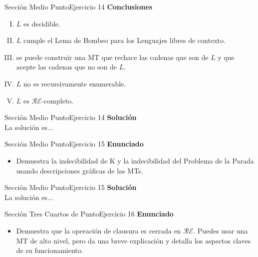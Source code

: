\documentclass[10pt, envcountsect, presentation, aspectratio=169]{beamer}
\newcommand{\lr}{\ensuremath{\mathcal {RE}}}
\begin{document}

\begin{frame}{Sección Medio Punto}{Ejercicio 14}
    \textbf{Conclusiones}
    \begin{enumerate}[I.]
        \item $L$ es  decidible.
        \item $L$ cumple el Lema de Bombeo para los Lenguajes  libres de contexto.
        \item se puede construir una MT que rechace las cadenas que son de $L$ y que acepte las cadenas que no son de $L$.
        \item $L$ no es recursivamente enumerable.
        \item $L$ es \lr-completo. 
    \end{enumerate}
\end{frame}


\begin{frame}{Sección Medio Punto}{Ejercicio 14}
    \textbf{Solución}\\
    La solución es...
\end{frame}


\begin{frame}{Sección Medio Punto}{Ejercicio 15}
    \textbf{Enunciado}
    \begin{itemize}
        \item Demuestra la indecibilidad de K y la indecibilidad del Problema de la Parada usando descripciones gráficas de las MTs.
    \end{itemize}
\end{frame}


\begin{frame}{Sección Medio Punto}{Ejercicio 15}
    \textbf{Solución}\\
    La solución es...
\end{frame}


\begin{frame}{Sección Tres Cuartos de Punto}{Ejercicio 16}
    \textbf{Enunciado}
    \begin{itemize}
        \item Demuestra que la operación de clausura es cerrada en $\lr$. Puedes usar una MT de alto nivel, pero da una breve explicación y detalla los aspectos claves de su funcionamiento.
    \end{itemize}
\end{frame}
\end{document}
